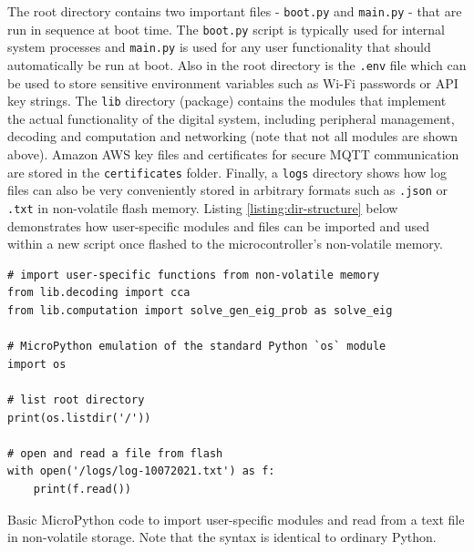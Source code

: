 The root directory contains two important files - \texttt{boot.py} and \texttt{main.py} - that are run in sequence at boot time. The \texttt{boot.py} script is typically used for internal system processes and \texttt{main.py} is used for any user functionality that should automatically be run at boot. Also in the root directory is the \texttt{.env} file which can be used to store sensitive environment variables such as Wi-Fi passwords or API key strings. The \texttt{lib} directory (package) contains the modules that implement the actual functionality of the digital system, including peripheral management, decoding and computation and networking (note that not all modules are shown above). Amazon AWS key files and certificates for secure MQTT communication are stored in the \texttt{certificates} folder. Finally, a \texttt{logs} directory shows how log files can also be very conveniently stored in arbitrary formats such as \texttt{.json} or \texttt{.txt} in non-volatile flash memory. Listing \ref{listing:dir-structure} below demonstrates how user-specific modules and files can be imported and used within a new script once flashed to the microcontroller's non-volatile memory. 

\begin{listing}[h]
\begin{verbatim}
# import user-specific functions from non-volatile memory
from lib.decoding import cca
from lib.computation import solve_gen_eig_prob as solve_eig

# MicroPython emulation of the standard Python `os` module
import os

# list root directory
print(os.listdir('/'))

# open and read a file from flash
with open('/logs/log-10072021.txt') as f:
    print(f.read())
\end{verbatim}
\caption[Basic MicroPython code to import user-specific modules and read from a text file in non-volatile storage.]{Basic MicroPython code to import user-specific modules and read from a text file in non-volatile storage. Note that the syntax is identical to ordinary Python.}
\label{listing:dir-structure}
\end{listing}

